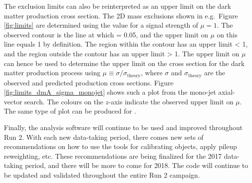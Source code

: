 The \monoZ exclusion limits can also be reinterpreted as an upper limit on the dark matter production cross section. The 2D mass exclusions shown in e.g.\ Figure \ref{fig:limits} are determined using the \cls value for a signal strength of $\mu=1$. The observed contour is the line at which \cls = 0.05, and the upper limit on $\mu$ on this line equals 1 by definition. The region within the contour has an upper limit < 1, and the region outside the contour has an upper limit > 1. The upper limit on $\mu$ can hence be used to determine the upper limit on the cross section for the dark matter production process using $\mu \equiv \sigma/\sigma_\text{theory}$, where $\sigma$ and $\sigma_\text{theory}$ are the observed and predicted production cross sections. Figure \ref{fig:limits_dmA_sigma_monojet} shows such a plot from the mono-jet axial-vector search. The colours on the $z$-axis indicate the observed upper limit on $\mu$. The same type of plot can be produced for \monoZ.

Finally, the \monoZ analysis software will continue to be used and improved throughout Run 2. With each new data-taking period, there comes new sets of recommendations on how to use the tools for calibrating objects, apply pileup reweighting, etc.
These recommendations are being finalized for the 2017 data-taking period, and there will be more to come for 2018. The code will continue to be updated and validated throughout the entire Run 2 campaign.

